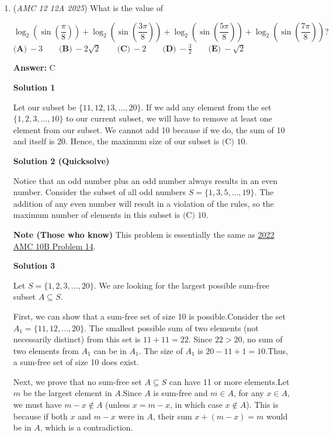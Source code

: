 \begin{enumerate}
	\item (\textit{AMC 12 12A 2025}) What is the value of

 \[\log_{2}\left( \sin\left( \frac{\pi}{8} \right)  \right) + \log_{2}\left( \sin\left( \frac{3\pi}{8} \right)  \right) + \log_{2}\left( \sin\left( \frac{5\pi}{8} \right)  \right) + \log_{2}\left( \sin\left( \frac{7\pi}{8} \right)  \right)?\]
$\textbf{(A)}\   -3  \qquad                 \textbf{(B)}\   -2\sqrt{2}  \qquad                 \textbf{(C)}\   -2  \qquad                 \textbf{(D)}\   -\frac{3}{2}  \qquad                 \textbf{(E)}\   -\sqrt{2}$

 \textbf{Answer: }C



\textbf{Solution 1}

Let our subset be $\{11,12,13,...,20\}.$ If we add any element from the set $\{1,2,3,...,10\}$ to our current subset, we will have to remove at least one element from our subset. We cannot add 10 because if we do, the sum of 10 and itself is 20. Hence, the maximum size of our subset is $\boxed{\text{(C) }10}$.

 



\textbf{Solution 2 (Quicksolve)}

Notice that an odd number plus an odd number always results in an even number. Consider the subset of all odd numbers $S = \{1, 3, 5, ..., 19\}$. The addition of any even number will result in a violation of the rules, so the maximum number of elements in this subset is $\boxed{\text{(C) }10}$.

 \textbf{Note (Those who know)} This problem is essentially the same as \href{https://artofproblemsolving.com/wiki/index.php?title=2022\_AMC\_10B\_Problems/Problem\_14}{2022 AMC 10B Problem 14}.

 



\textbf{Solution 3}

Let $S = \{1, 2, 3, ..., 20\}$. We are looking for the largest possible sum-free subset $A \subseteq S$.

 First, we can show that a sum-free set of size 10 is possible.Consider the set $A_1 = \{11, 12, ..., 20\}$. The smallest possible sum of two elements (not necessarily distinct) from this set is $11 + 11 = 22$. Since $22 > 20$, no sum of two elements from $A_1$ can be in $A_1$. The size of $A_1$ is $20 - 11 + 1 = 10$.Thus, a sum-free set of size 10 does exist.

 Next, we prove that no sum-free set $A \subseteq S$ can have 11 or more elements.Let $m$ be the largest element in $A$.Since $A$ is sum-free and $m \in A$, for any $x \in A$, we must have $m-x \notin A$ (unless $x = m-x$, in which case $x \notin A$). This is because if both $x$ and $m-x$ were in $A$, their sum $x + (m-x) = m$ would be in $A$, which is a contradiction.


\end{enumerate}
